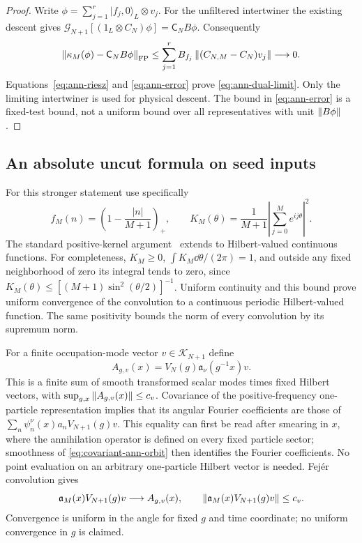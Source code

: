 \begin{proof}
Write $\phi=\sum_{j=1}^r |f_j,0\rangle_L\otimes v_j$.
For the unfiltered intertwiner the existing descent gives
$\mathcal G_{N+1}[(1_L\otimes C_N)\phi]=\mathsf C_NB\phi$.
Consequently
\begin{equation}
 \left\lVert\kappa_M(\phi)-\mathsf C_NB\phi\right\rVert_{\mathrm{FP}}
 \le\sum_{j=1}^r B_{f_j}\left\lVert(C_{N,M}-C_N)v_j\right\rVert
 \longrightarrow0.
 \label{eq:ann-error}
\end{equation}
Equations~\eqref{eq:ann-riesz} and \eqref{eq:ann-error} prove
\eqref{eq:ann-dual-limit}. Only the limiting intertwiner is used for
physical descent. The bound in \eqref{eq:ann-error} is a fixed-test bound,
not a uniform bound over all representatives with unit $\left\lVert B\phi\right\rVert$.
\end{proof}

\subsection{An absolute uncut formula on seed inputs}
For this stronger statement use specifically
\begin{equation}
 f_M(n)=\left(1-\frac{|n|}{M+1}\right)_+,\qquad
 K_M(\theta)=\frac1{M+1}\left|\sum_{j=0}^M e^{ij\theta}\right|^2.
 \label{eq:fejer-filter}
\end{equation}
The standard positive-kernel argument~\cite[Appendix B]{VasyFourier}
extends to Hilbert-valued continuous functions. For completeness,
$K_M\ge0$, $\int K_M\dd\theta/(2\pi)=1$, and outside any fixed
neighborhood of zero its integral tends to zero, since
$K_M(\theta)\le[(M+1)\sin^2(\theta/2)]^{-1}$.
Uniform continuity and this bound prove uniform convergence of the
convolution to a continuous periodic Hilbert-valued function. The same
positivity bounds the norm of every convolution by its supremum norm.

For a finite occupation-mode vector $v\in\mathcal K_{N+1}$ define
\begin{equation}
 A_{g,v}(x)=V_N(g)\mathfrak a_\nu(g^{-1}x)v.
 \label{eq:covariant-ann-orbit}
\end{equation}
This is a finite sum of smooth transformed scalar modes times fixed
Hilbert vectors, with $\sup_{g,x}\left\lVert A_{g,v}(x)\right\rVert\le c_v$.
Covariance of the positive-frequency one-particle representation implies
that its angular Fourier coefficients are those of
$\sum_n\psi_n^\nu(x)a_nV_{N+1}(g)v$. This equality can first be read
after smearing in $x$, where the annihilation operator is defined on
every fixed particle sector; smoothness of \eqref{eq:covariant-ann-orbit}
then identifies the Fourier coefficients. No point evaluation on an
arbitrary one-particle Hilbert vector is needed. Fej\'er convolution gives
\begin{equation}
 \mathfrak a_M(x)V_{N+1}(g)v\longrightarrow A_{g,v}(x),\qquad
 \left\lVert\mathfrak a_M(x)V_{N+1}(g)v\right\rVert\le c_v.
 \label{eq:ann-fejer-domination}
\end{equation}
Convergence is uniform in the angle for fixed $g$ and time coordinate;
no uniform convergence in $g$ is claimed.

